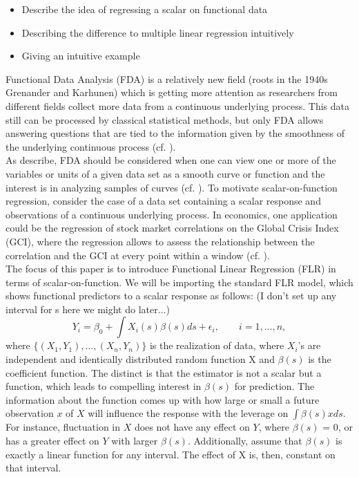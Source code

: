 \documentclass[11pt,twoside,a4paper]{article}
\begin{document}
	\begin{itemize}
		\item Describe the idea of regressing a scalar on functional data
		\item Describing the difference to multiple linear regression intuitively
		\item Giving an intuitive example
	\end{itemize}	
	Functional Data Analysis (FDA) is a relatively new field {\color{red} (roots in the 1940s Grenander and Karhunen)} which is getting more attention as researchers from different fields collect more data from a continuous underlying process. This data still can be processed by classical statistical methods, but only FDA allows answering questions that are tied to the information given by the smoothness of the underlying continuous process (cf. \cite{levitin_introduction_2007}).\\
	 As \cite{kokoszka_introduction_2017} describe, FDA should be considered when one can view one or more of the variables or units of a given data set as a smooth curve or function and the interest is in analyzing samples of curves (cf. \cite[S.~17]{kokoszka_introduction_2017}).
	 To motivate scalar-on-function regression, consider the case of a data set containing a scalar response and observations of a continuous underlying process. In economics, one application could be the regression of stock market correlations on the Global Crisis Index (GCI), where the regression allows to assess the relationship between the correlation and the GCI at every point within a window (cf. \cite{Das_2019}).\\
	 The focus of this paper is to introduce Functional Linear Regression (FLR) in terms of scalar-on-function. We will be importing the standard FLR model, which shows functional predictors to a scalar response as follows:  {\color{red} (I don't set up any interval for s here we might do later...)}
	 $$Y_{i} = \beta_{0} + \int{X_{i}(s)\beta(s)ds} + \epsilon_{i},
	 \qquad i = 1, ..., n,$$
	 where $\{(X_{1}, Y_{1}), …, (X_{n}, Y_{n})\}$ is the realization of data, where $X_{i}$’s are independent and identically distributed random function X and $\beta(s)$ is the coefficient function. The distinct is that the estimator is not a scalar but a function, which leads to compelling interest in $\beta(s)$ for prediction. The information about the function comes up with how large or small a future observation $x$ of $X$ will influence the response with the leverage on $\int{\beta(s)xds}$. For instance, fluctuation in $X$ does not have any effect on $Y$, where $\beta(s)$ = 0, or has a greater effect on $Y$ with larger $\beta(s)$. Additionally, assume that $\beta(s)$ is exactly a linear function for any interval. The effect of X is, then, constant on that interval.\\
\end{document}
